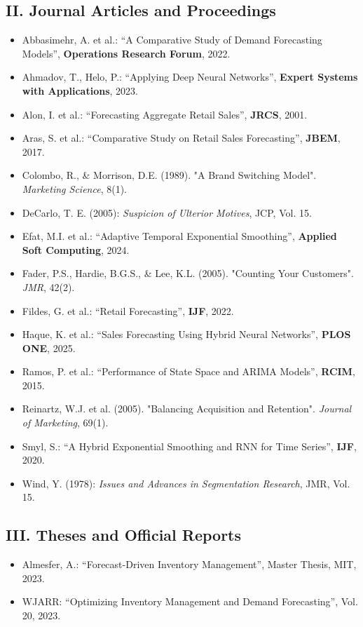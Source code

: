 \documentclass[12pt,a4paper,oneside]{report}
\begin{document}
\subsection*{II. Journal Articles and Proceedings}
\begin{itemize}
    \item Abbasimehr, A. et al.: ``A Comparative Study of Demand Forecasting Models'', \textbf{Operations Research Forum}, 2022.
    \item Ahmadov, T., Helo, P.: ``Applying Deep Neural Networks'', \textbf{Expert Systems with Applications}, 2023.
    \item Alon, I. et al.: ``Forecasting Aggregate Retail Sales'', \textbf{JRCS}, 2001.
    \item Aras, S. et al.: ``Comparative Study on Retail Sales Forecasting'', \textbf{JBEM}, 2017.
    \item Colombo, R., \& Morrison, D.E. (1989). "A Brand Switching Model". \textit{Marketing Science}, 8(1).
    \item DeCarlo, T. E. (2005): \textit{Suspicion of Ulterior Motives}, JCP, Vol. 15.
    \item Efat, M.I. et al.: ``Adaptive Temporal Exponential Smoothing'', \textbf{Applied Soft Computing}, 2024.
    \item Fader, P.S., Hardie, B.G.S., \& Lee, K.L. (2005). "Counting Your Customers". \textit{JMR}, 42(2).
    \item Fildes, G. et al.: ``Retail Forecasting'', \textbf{IJF}, 2022.
    \item Haque, K. et al.: ``Sales Forecasting Using Hybrid Neural Networks'', \textbf{PLOS ONE}, 2025.
    \item Ramos, P. et al.: ``Performance of State Space and ARIMA Models'', \textbf{RCIM}, 2015.
    \item Reinartz, W.J. et al. (2005). "Balancing Acquisition and Retention". \textit{Journal of Marketing}, 69(1).
    \item Smyl, S.: ``A Hybrid Exponential Smoothing and RNN for Time Series'', \textbf{IJF}, 2020.
    \item Wind, Y. (1978): \textit{Issues and Advances in Segmentation Research}, JMR, Vol. 15.
\end{itemize}

\subsection*{III. Theses and Official Reports}
\begin{itemize}
    \item Almesfer, A.: ``Forecast-Driven Inventory Management'', Master Thesis, MIT, 2023.
    \item WJARR: ``Optimizing Inventory Management and Demand Forecasting'', Vol. 20, 2023.
\end{itemize}
\end{document}

